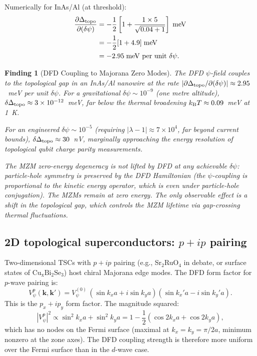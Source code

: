 \documentclass[11pt]{article}
\newtheorem{finding}{Finding}
\newcommand{\ee}[1]{\times 10^{#1}}
\newcommand{\kB}{k_{\rm B}}
\begin{document}
Numerically for InAs/Al (at threshold):
\begin{align}
\frac{\partial\Delta_{\rm topo}}{\partial(\delta\psi)}
&= -\frac{1}{2}\left[1 + \frac{1 \times 5}{\sqrt{0.04+1}}\right]\;\text{meV}\notag\\
&= -\frac{1}{2}[1 + 4.9]\;\text{meV}\notag\\
&= -2.95\;\text{meV per unit }\delta\psi.
\label{eq:dDelta-InAs}
\end{align}

\begin{finding}[DFD Coupling to Majorana Zero Modes]
\label{finding:MZM-coupling}
The DFD $\psi$-field couples to the topological gap in an InAs/Al nanowire
at the rate $|\partial\Delta_{\rm topo}/\partial(\delta\psi)| \approx 2.95$~meV
per unit $\delta\psi$. For a gravitational $\delta\psi \sim 10^{-9}$ (one metre
altitude), $\delta\Delta_{\rm topo} \approx 3\ee{-12}$~meV, far below the
thermal broadening $\kB T \approx 0.09$~meV at 1~K.

For an engineered $\delta\psi \sim 10^{-5}$ (requiring $|\lambda-1| \approx 7\ee{4}$,
far beyond current bounds), $\delta\Delta_{\rm topo} \approx 30$~nV, marginally
approaching the energy resolution of topological qubit charge parity measurements.

The MZM zero-energy degeneracy is not lifted by DFD at any achievable
$\delta\psi$: particle-hole symmetry is preserved by the DFD Hamiltonian
(the $\psi$-coupling is proportional to the kinetic energy operator, which
is even under particle-hole conjugation). The MZMs remain at zero energy.
The only observable effect is a shift in the \emph{topological gap}, which
controls the MZM lifetime via gap-crossing thermal fluctuations.
\end{finding}

\subsection{2D topological superconductors: $p+ip$ pairing}

Two-dimensional TSCs with $p+ip$ pairing (e.g., Sr$_2$RuO$_4$ in debate,
or surface states of $\mathrm{Cu_x Bi_2 Se_3}$) host chiral Majorana edge
modes. The DFD form factor for $p$-wave pairing is:
\begin{equation}
V_\psi^p(\mathbf{k},\mathbf{k}') = V_\psi^{(0)}\,
  (\sin k_x a + i\sin k_y a)(\sin k_x' a - i\sin k_y' a).
\label{eq:Vpsi-p}
\end{equation}
This is the $p_{x}+ip_{y}$ form factor. The magnitude squared:
\begin{equation}
|V_\psi^p|^2 \propto \sin^2 k_x a + \sin^2 k_y a
= 1 - \frac{1}{2}(\cos 2k_x a + \cos 2k_y a),
\label{eq:Vpsi-p-sq}
\end{equation}
which has no nodes on the Fermi surface (maximal at $k_x = k_y = \pi/2a$,
minimum nonzero at the zone axes). The DFD coupling strength is therefore
more uniform over the Fermi surface than in the $d$-wave case.
\end{document}

